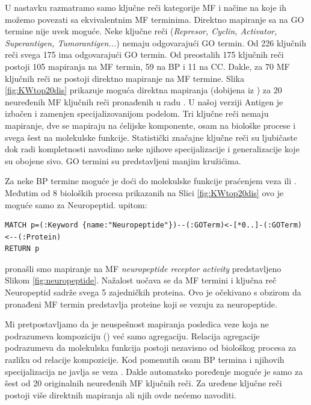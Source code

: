 U nastavku razmatramo samo ključne reči kategorije MF
i načine na koje ih možemo povezati sa ekvivalentnim MF terminima.
Direktno mapiranje sa  na GO
termine nije uvek moguće.  Neke ključne reči (\textit{Represor, Cyclin, Activator,
Superantigen, Tumorantigen...}) nemaju odgovarajući GO termin. Od 226 ključnih
reči svega 175 ima odgovarajući GO termin. Od preostalih 175 ključnih reči
postoji 105 mapiranja na MF termin, 59 na BP
i 11 na CC.  Dakle, za 70 MF ključnih reči ne postoji direktno mapiranje na MF
termine.  Slika \ref{fig:KWtop20dis} prikazuje moguća direktna mapiranja
(dobijena iz ) za 20 neuređenih MF ključnih reči pronađenih
u radu \parencite{Xie2007}.  U našoj verziji  Antigen je
izbačen i zamenjen specijalizovanijom podelom. Tri ključne reči nemaju
mapiranje, dve se mapiraju na ćelijske komponente, osam na biološke procese i
svega šest na molekulske funkcije. Statistički značajne ključne reči su
ljubičaste dok radi kompletnosti navodimo neke njihove specijalizacije i
generalizacije koje su obojene sivo. GO termini su predstavljeni manjim
kružićima. 

Za neke BP termine moguće je doći do molekulske funkcije praćenjem veza  ili . Međutim od 8 bioloških procesa prikazanih na Slici
\ref{fig:KWtop20dis} ovo je moguće samo za Neuropeptid.
 upitom:
\begin{verbatim}
MATCH p=(:Keyword {name:"Neuropeptide"})--(:GOTerm)<-[*0..]-(:GOTerm)<--(:Protein)
RETURN p
\end{verbatim}
pronašli smo mapiranje na MF \textit{neuropeptide receptor activity}
predstavljeno Slikom \ref{fig:neuropeptide}.  Nažalost uočava se da MF termini
i ključna reč Neuropeptid sadrže svega 5 zajedničkih proteina. Ovo je očekivano
s obzirom da pronađeni MF termin predstavlja proteine koji se vezuju za
neuropeptide.

Mi pretpostavljamo da je neuspešnost mapiranja posledica veze  koja ne
podrazumeva kompoziciju () već samo agregaciju. Relacija
agregacije podrazumeva da molekulska funkcija postoji nezavisno od biološkog
procesa za razliku od relacije kompozicije. Kod pomenutih osam BP termina i njihovih
specijalizacija ne javlja se veza .
Dakle automatsko poređenje moguće je samo za šest od 20 originalnih neuređenih MF 
ključnih reči. Za uređene ključne reči postoji više direktnih mapiranja ali njih
ovde nećemo navoditi.

